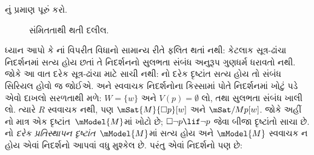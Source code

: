 \documentclass[../../../include/open-logic-section]{subfiles}
\begin{document}
\begin{prob}
  નું પ્રમાણ
  પૂરું કરો.
\end{prob}

\begin{figure}
  \begin{center}
  \end{center}
\caption{સંમિતતાથી થતી દલીલ.}
\end{figure}

ધ્યાન આપો કે નાં વિપરીત
વિધાનો સામાન્ય રીતે ફલિત થતાં નથી: કેટલાક સૂત્ર-ઢાંચા
નિદર્શનમાં સત્ય હોય છતાં તે નિદર્શનનો સુલભતા સંબંધ
અનુરૂપ ગુણધર્મ ધરાવતો નથી. જોકે આ વાત દરેક સૂત્ર-ઢાંચા
માટે સાચી નથી: નો દરેક દૃષ્ટાંત સત્ય હોય તો સંબંધ
સિરિયલ હોવો જ જોઈએ.  અને સ્વવાચક
નિદર્શનોના કિસ્સામાં  પોતે નિદર્શનમાં ખોટું
પડે એવો દાખલો સરળતાથી મળે: $W = \{w\}$ અને
$V(p) = \emptyset$ લો, તથા સુલભતા સંબંધ ખાલી લો.
ત્યારે $R$ સ્વવાચક નથી, પણ
$\mSat{M}{\Box
  p}[w]$ અને $\mSat/{M}{p}[w]$. જોકે અહીં
નો માત્ર એક દૃષ્ટાંત~$\mModel{M}$માં
ખોટો છે; $\Box \lnot p \lif \lnot p$ જેવા
બીજા દૃષ્ટાંતો સાચા છે. નો
\emph{દરેક પ્રતિસ્થાપન દૃષ્ટાંત}~$\mModel{M}$માં
સત્ય હોય અને $\mModel{M}$ સ્વવાચક ન હોય એવાં
નિદર્શનો આપવાં વધુ મુશ્કેલ છે. પરંતુ એવાં
નિદર્શનો પણ છે:
\end{document}
